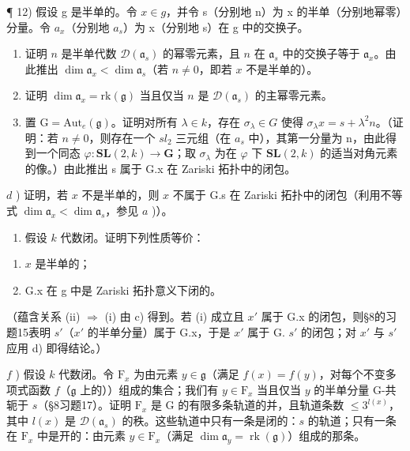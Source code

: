 ¶ 12) 假设 g 是半单的。令 \(x \in g\)，并令 s（分别地 n）为 x 的半单（分别地幂零）分量。令 \(a_{x}\)（分别地 \(a_{s}\)）为 x（分别地 s）在 g 中的交换子。

\begin{enumerate}
\def\labelenumi{\alph{enumi})}
\item
  证明 \(n\) 是半单代数 \(\mathcal{D}(\mathfrak{a}_s)\) 的幂零元素，且 \(n\) 在 \(\mathfrak{a}_s\) 中的交换子等于 \(\mathfrak{a}_x\)。由此推出 \(\dim \mathfrak{a}_x < \dim \mathfrak{a}_s\)（若 \(n \neq 0\)，即若 \(x\) 不是半单的）。
\item
  证明 \(\dim \mathfrak{a}_x = \mathrm{rk}(\mathfrak{g})\) 当且仅当 \(n\) 是 \(\mathcal{D}(\mathfrak{a}_s)\) 的主幂零元素。
\item
  置 \(\mathrm{G} = \mathrm{Aut}_{e}(\mathfrak{g})\)。证明对所有 \(\lambda \in k\)，存在 \(\sigma_{\lambda} \in G\) 使得 \(\sigma_{\lambda}x = s + \lambda^{2}n\)。（证明：若 \(n \neq 0\)，则存在一个 \(sl_{2}\) 三元组（在 \(a_{s}\) 中），其第一分量为 n，由此得到一个同态 \(\varphi : \mathbf{SL}(2, k) \to \mathbf{G}\)；取 \(\sigma_{\lambda}\) 为在 \(\varphi\) 下 \(\mathbf{SL}(2, k)\) 的适当对角元素的像。）由此推出 s 属于 G.x 在 Zariski 拓扑中的闭包。
\end{enumerate}

\(d\) ) 证明，若 \(x\) 不是半单的，则 \(x\) 不属于 G.s 在 Zariski 拓扑中的闭包（利用不等式 \(\dim \mathfrak{a}_x < \dim \mathfrak{a}_s\)，参见 \(a\) )）。

\begin{enumerate}
\def\labelenumi{\alph{enumi})}
\setcounter{enumi}{4}
\tightlist
\item
  假设 \(k\) 代数闭。证明下列性质等价：
\end{enumerate}

\begin{enumerate}
\def\labelenumi{(\roman{enumi})}
\item
  \(x\) 是半单的；
\item
  G.x 在 g 中是 Zariski 拓扑意义下闭的。
\end{enumerate}

（蕴含关系 (ii) \(\Longrightarrow\) (i) 由 c) 得到。若 (i) 成立且 \(x'\) 属于 G.x 的闭包，则§8的习题15表明 \(s'\)（\(x'\) 的半单分量）属于 G.x，于是 \(x'\) 属于 G. \(s'\) 的闭包；对 \(x'\) 与 \(s'\) 应用 d) 即得结论。）

\(f\) ) 假设 \(k\) 代数闭。令 \(\mathrm{F}_x\) 为由元素 \(y\in \mathfrak{g}\)（满足 \(f(x) = f(y)\)，对每个不变多项式函数 \(f\)（\(\mathfrak{g}\) 上的））组成的集合；我们有 \(y\in \mathrm{F}_x\) 当且仅当 \(y\) 的半单分量 G-共轭于 \(s\)（§8习题17）。证明 \(\mathrm{F}_x\) 是 G 的有限多条轨道的并，且轨道条数 \(\leq 3^{l(x)}\)，其中 \(l(x)\) 是 \(\mathcal{D}(\mathfrak{a}_s)\) 的秩。这些轨道中只有一条是闭的：\(s\) 的轨道；只有一条在 \(\mathrm{F}_x\) 中是开的：由元素 \(y\in \mathrm{F}_x\)（满足 \(\dim \mathfrak{a}_y = \operatorname {rk}(\mathfrak{g})\)）组成的那条。

